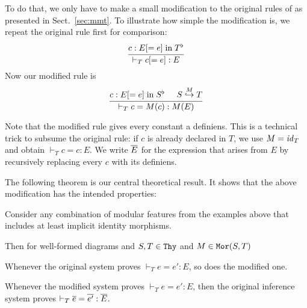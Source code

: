 To do that, we only have to make a small modification to the original rules of \mmt as presented in Sect.~\ref{sec:mmt}.
To illustrate how simple the modification is, we repeat the original rule first for comparison:
\[\rul{c:E[=e] \minn \flt{T}}{\vdash_T c[=e]:E}\]
Now our modified rule is
\[\rul{c:E[=e] \minn \flt{S}\tb \ipc{M}{S}{T}}{\vdash_T c=M(c):M(E)}\]

Note that the modified rule gives every constant a definiens.
This is a technical trick to subsume the original rule: if $c$ is already declared in $T$, we use $M=\id{T}$ and obtain $\vdash_T c=c:E$.
We write $\ov{E}$ for the expression that arises from $E$ by recursively replacing every $c$ with its definiens.

The following theorem is our central theoretical result.
It shows that the above modification has the intended properties:
\begin{theorem}
Consider any combination of modular features from the examples above that includes at least implicit identity morphisms.

Then for well-formed diagrams and $S,T\in\Thy$ and $M\in\Mo{S}{T}$
\begin{compactenum}
 \item Whenever the original system proves $\vdash_T e=e':E$, so does the modified one.
 \item Whenever the modified system proves $\vdash_T e=e':E$, then the original inference system proves $\vdash_T \ov{e}=\ov{e'}:\ov{E}$.
\end{compactenum}
\end{theorem}


